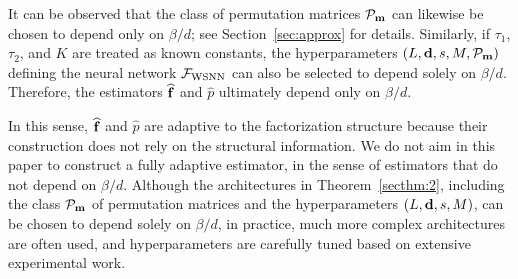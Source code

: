 \documentclass[twoside,11pt]{article}
\def\cF{\mathcal F}
\def\cP{\mathcal P}
\def\cQ{\mathcal Q}
\def\cR{\mathcal R}
\newcommand{\bd}{{\bf d}}
\newcommand{\bff}{{\bf f}}
\newcommand{\bfm}{{\bf m}}
\begin{document}
It can be observed that the class of permutation matrices $\cP_{\bfm}$ can likewise be chosen to depend only on $\beta/d$; see Section~\ref{sec:approx} for details.
Similarly, if $\tau_1$, $\tau_2$, and $K$ are treated as known constants, the hyperparameters $(L, \bd, s, M, \cP_{\bfm})$ defining the neural network $\cF_{\rm WSNN}$ can also be selected to depend solely on $\beta/d$.
Therefore, the estimators $\widehat \bff$ and $\widehat p$ ultimately depend only on $\beta/d$.



In this sense, $\widehat \bff$ and $\widehat p$ are adaptive to the factorization structure because their construction does not rely on the structural information. 
We do not aim in this paper to construct a fully adaptive estimator, in the sense of estimators that do not depend on $\beta/d$.
Although the architectures in Theorem~\ref{secthm:2}, including the class $\cP_{\bfm}$ of permutation matrices and the hyperparameters $(L, \bd, s, M)$, can be chosen to depend solely on $\beta/d$, in practice, much more complex architectures are often used, and hyperparameters are carefully tuned based on extensive experimental work.




\end{document}
